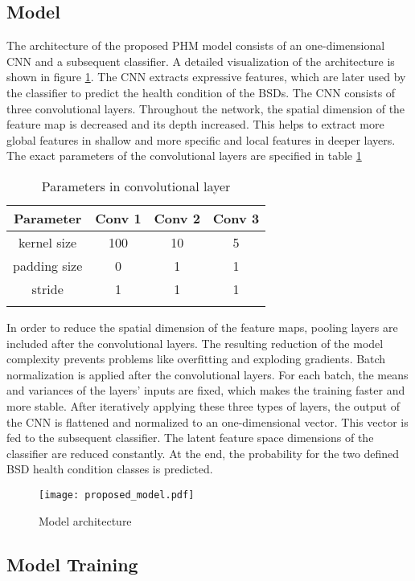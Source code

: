 \subsection{Model}
\label{sec:model}
The architecture of the proposed PHM model consists of an one-dimensional CNN and a subsequent classifier. A detailed visualization of the architecture is shown in figure \ref{fig:proposed_model}. The CNN extracts expressive features, which are later used by the classifier to predict the health condition of the BSDs. The CNN consists of three convolutional layers. Throughout the network, the spatial dimension of the feature map is decreased and its depth increased. This helps to extract more global features in shallow and more specific and local features in deeper layers. The exact parameters of the convolutional layers are specified in table \ref{tab:parameter_conv} 
\begin{longtable}{c c c c} 
\toprule
Parameter & Conv 1 & Conv 2 & Conv 3 \\
\midrule
kernel size & 100 & 10 & 5 \\

padding size & 0 & 1 & 1 \\

stride & 1 & 1 & 1 \\
\bottomrule
\caption {Parameters in convolutional layer}
\label {tab:parameter_conv}
\end{longtable}

In order to reduce the spatial dimension of the feature maps, pooling layers are included after the convolutional layers. The resulting reduction of the model complexity prevents problems like overfitting and exploding gradients. Batch normalization is applied after the convolutional layers. For each batch, the means and variances of the layers' inputs are fixed, which makes the training faster and more stable. After iteratively applying these three types of layers, the output of the CNN is flattened and normalized to an one-dimensional vector. This vector is fed to the subsequent classifier. The latent feature space dimensions of the classifier are reduced constantly. At the end, the probability for the two defined BSD health condition classes is predicted.


\begin{figure}[H]
  \centering
  \texttt{[image: proposed\_model.pdf]}
  \caption {Model architecture} \label{fig:proposed_model}
\end{figure}


\subsection{Model Training} \label{sec:Proposed_training}

